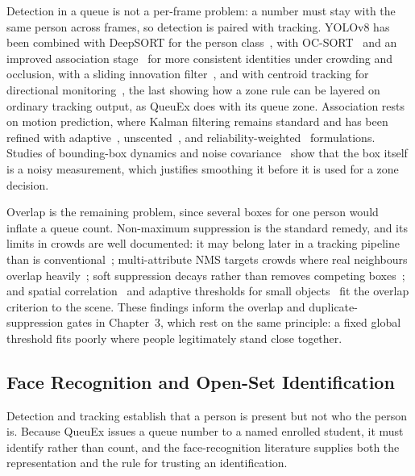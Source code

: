\documentclass{research}
\newcommand{\sysname}{QueuEx}
\begin{document}
Detection in a queue is not a per-frame problem: a number must stay with
the same person across frames, so detection is paired with tracking.
YOLOv8 has been combined with DeepSORT for the person
class~\cite{rrlcomp003persondetectionproposed}, with
OC-SORT~\cite{rrlcomp017multiobjectpedestrian} and an improved
association stage~\cite{rrlcomp018multiobjectivepedestrian} for more
consistent identities under crowding and occlusion, with a sliding
innovation filter~\cite{rrlcomp098objectdetectiontracking}, and with
centroid tracking for directional
monitoring~\cite{rrlcomp099realtimewrong}, the last showing how a zone
rule can be layered on ordinary tracking output, as \sysname{} does with
its queue zone. Association rests on motion prediction, where Kalman
filtering remains standard and has been refined with
adaptive~\cite{rrlcomp061adaptivekalmanfilter},
unscented~\cite{rrlcomp062achievingadaptivevisual}, and
reliability-weighted~\cite{rrlcomp063robustvisualtracking}
formulations. Studies of bounding-box dynamics and noise
covariance~\cite{rrlcomp064boundingboxdynamics} show that the box itself
is a noisy measurement, which justifies smoothing it before it is used
for a zone decision.

Overlap is the remaining problem, since several boxes for one person
would inflate a queue count. Non-maximum suppression is the standard
remedy, and its limits in crowds are well documented: it may belong
later in a tracking pipeline than is
conventional~\cite{rrlcomp046nonmaximumsuppression}; multi-attribute NMS
targets crowds where real neighbours overlap
heavily~\cite{rrlcomp047multiattributenms}; soft suppression decays
rather than removes competing boxes~\cite{rrlcomp086enhancednmsdetection};
and spatial correlation~\cite{rrlcomp089spatialnonmaximum} and adaptive
thresholds for small objects~\cite{rrlcomp090adaptiveiouthresholding}
fit the overlap criterion to the scene. These findings inform the
overlap and duplicate-suppression gates in Chapter~3, which rest on the
same principle: a fixed global threshold fits poorly where people
legitimately stand close together.

\subsection{Face Recognition and Open-Set Identification}

Detection and tracking establish that a person is present but not who
the person is. Because \sysname{} issues a queue number to a named
enrolled student, it must identify rather than count, and the
face-recognition literature supplies both the representation and the
rule for trusting an identification.
\end{document}
